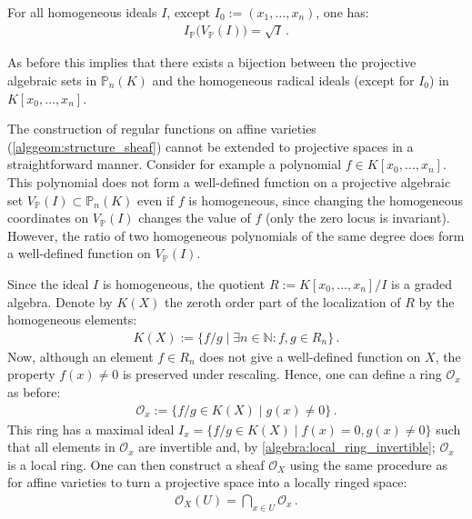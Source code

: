     \begin{theorem}
        For all homogeneous ideals $I$, except $I_0:=(x_1,\ldots,x_n)$, one has:
        \begin{gather}
            I_{\mathbb{P}}\bigl(V_{\mathbb{P}}(I)\bigr) = \sqrt{I}\,.
        \end{gather}
    \end{theorem}
    \begin{result}
        As before this implies that there exists a bijection between the projective algebraic sets in $\mathbb{P}_n(K)$ and the homogeneous radical ideals (except for $I_0$) in $K[x_0,\ldots,x_n]$.
    \end{result}


    The construction of regular functions on affine varieties (\cref{alggeom:structure_sheaf}) cannot be extended to projective spaces in a straightforward manner. Consider for example a polynomial $f\in K[x_0,\ldots,x_n]$. This polynomial does not form a well-defined function on a projective algebraic set $V_{\mathbb{P}}(I)\subset\mathbb{P}_n(K)$ even if $f$ is homogeneous, since changing the homogeneous coordinates on $V_{\mathbb{P}}(I)$ changes the value of $f$ (only the zero locus is invariant). However, the ratio of two homogeneous polynomials of the same degree does form a well-defined function on $V_{\mathbb{P}}(I)$.

    Since the ideal $I$ is homogeneous, the quotient $R:=K[x_0,\ldots,x_n]/I$ is a graded algebra. Denote by $K(X)$ the zeroth order part of the localization of $R$ by the homogeneous elements:
    \begin{gather}
        K(X) := \{f/g\mid\exists n\in\mathbb{N}:f,g\in R_n\}\,.
    \end{gather}
    Now, although an element $f\in R_n$ does not give a well-defined function on $X$, the property $f(x)\neq0$ is preserved under rescaling. Hence, one can define a ring $\mathcal{O}_x$ as before:
    \begin{gather}
        \mathcal{O}_x := \{f/g\in K(X)\mid g(x)\neq 0\}\,.
    \end{gather}
    This ring has a maximal ideal $I_x = \{f/g\in K(X)\mid f(x)=0,g(x)\neq 0\}$ such that all elements in $\mathcal{O}_x$ are invertible and, by \cref{algebra:local_ring_invertible}; $\mathcal{O}_x$ is a local ring. One can then construct a sheaf $\mathcal{O}_X$ using the same procedure as for affine varieties to turn a projective space into a locally ringed space:
    \begin{gather}
        \mathcal{O}_X(U) = \bigcap_{x\in U}\mathcal{O}_x\,.
    \end{gather}

